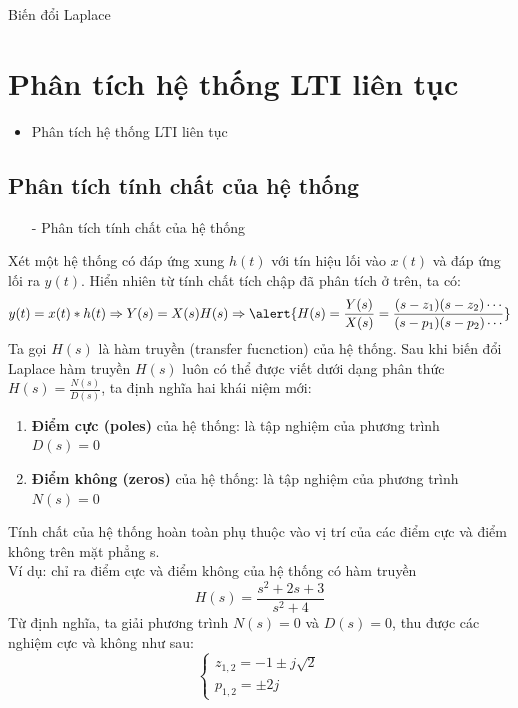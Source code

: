 \documentclass[8pt]{beamer}
\begin{document}
\begin{frame}{Biến đổi Laplace}
\section{Phân tích hệ thống LTI liên tục}
\begin{itemize}
	\item Phân tích hệ thống LTI liên tục
\end{itemize}
\subsection{Phân tích tính chất của hệ thống}
\begin{itemize}
	\item[-] Phân tích tính chất của hệ thống
\end{itemize}
Xét một hệ thống có đáp ứng xung $h(t)$ với tín hiệu lối vào $x(t)$ và đáp ứng lối ra $y(t)$. Hiển nhiên từ tính chất tích chập đã phân tích ở trên, ta có:
$$y(t)=x(t)*h(t)\Rightarrow Y(s)=X(s)H(s) \Rightarrow \alert{H(s)=\frac{Y(s)}{X(s)}=\frac{(s-z_{1})(s-z_{2})\cdots}{(s-p_{1})(s-p_{2})\cdots}}$$
Ta gọi $H(s)$ là hàm truyền (transfer fucnction) của hệ thống. Sau khi biến đổi Laplace hàm truyền $H(s)$ luôn có thể được viết dưới dạng phân thức $H(s)=\frac{N(s)}{D(s)}$, ta định nghĩa hai khái niệm mới:
\begin{enumerate}
	\item \textbf{Điểm cực (poles)} của hệ thống: là tập nghiệm của phương trình $D(s)=0$
	\item \textbf{Điểm không (zeros)} của hệ thống: là tập nghiệm của phương trình $N(s)=0$
\end{enumerate}
Tính chất của hệ thống \alert{hoàn toàn phụ thuộc vào vị trí của các điểm cực và điểm không trên mặt phẳng s}.
\\Ví dụ: chỉ ra điểm cực và điểm không của hệ thống có hàm truyền $$H(s)=\frac{s^2+2s+3}{s^2+4}$$
Từ định nghĩa, ta giải phương trình $N(s)=0$ và $D(s)=0$, thu được các nghiệm cực và không như sau:
\begin{equation*}
\begin{cases}
z_{1,2}=-1\pm j\sqrt{2}\\
p_{1,2}=\pm 2j
\end{cases}
\end{equation*}
\end{frame}
\end{document}
